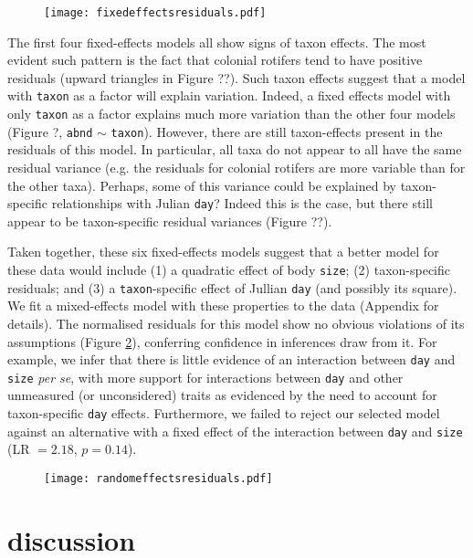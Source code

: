 \documentclass[12pt]{ecology}
\begin{document}
\begin{figure}
\texttt{[image: fixedeffectsresiduals.pdf]}
\caption{}
\label{fig:fixedeffectsresiduals}
\end{figure}

The first four fixed-effects models all show signs of taxon effects.  The most evident such pattern is the fact that colonial rotifers tend to have positive residuals (upward triangles in Figure ??).  Such taxon effects suggest that a model with \texttt{taxon} as a factor will explain variation.  Indeed, a fixed effects model with only \texttt{taxon} as a factor explains much more variation than the other four models (Figure ?, \texttt{abnd} $\sim$ \texttt{taxon}).  However, there are still taxon-effects present in the residuals of this model.  In particular, all taxa do not appear to all have the same residual variance (e.g. the residuals for colonial rotifers are more variable than for the other taxa).  Perhaps, some of this variance could be explained by taxon-specific relationships with Julian \texttt{day}?  Indeed this is the case, but there still appear to be taxon-specific residual variances (Figure ??).

Taken together, these six fixed-effects models suggest that a better model for these data would include (1) a quadratic effect of body \texttt{size}; (2) taxon-specific residuals; and (3) a \texttt{taxon}-specific effect of Jullian \texttt{day} (and possibly its square).  We fit a mixed-effects model with these properties to the data (Appendix for details).  The normalised residuals for this model show no obvious violations of its assumptions (Figure \ref{fig:randomeffectsresiduals}), conferring confidence in inferences draw from it.  For example, we infer that there is little evidence of an interaction between \texttt{day} and \texttt{size} \emph{per se}, with more support for interactions between \texttt{day} and other unmeasured (or unconsidered) traits as evidenced by the need to account for taxon-specific \texttt{day} effects.  Furthermore, we failed to reject our selected model against an alternative with a fixed effect of the interaction between \texttt{day} and \texttt{size} (LR $= 2.18$, $p = 0.14$).

\begin{figure}
\texttt{[image: randomeffectsresiduals.pdf]}
\caption{}
\label{fig:randomeffectsresiduals}
\end{figure}

\section{discussion}
\end{document}
